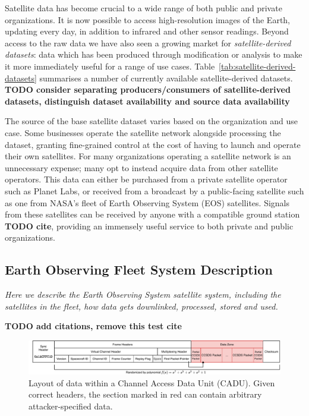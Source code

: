 Satellite data has become crucial to a wide range of both public and private organizations.
It is now possible to access high-resolution images of the Earth, updating every day, in addition to infrared and other sensor readings.
Beyond access to the raw data we have also seen a growing market for \textit{satellite-derived datasets}: data which has been produced through modification or analysis to make it more immediately useful for a range of use cases.
Table~\ref{tab:satellite-derived-datasets} summarises a number of currently available satellite-derived datasets.
\textbf{TODO consider separating producers/consumers of satellite-derived datasets, distinguish dataset availability and source data availability}

The source of the base satellite dataset varies based on the organization and use case.
Some businesses operate the satellite network alongside processing the dataset, granting fine-grained control at the cost of having to launch and operate their own satellites.
For many organizations operating a satellite network is an unnecessary expense; many opt to instead acquire data from other satellite operators.
This data can either be purchased from a private satellite operator such as Planet Labs, or received from a broadcast by a public-facing satellite such as one from NASA's fleet of Earth Observing System (EOS) satellites.
Signals from these satellites can be received by anyone with a compatible ground station \textbf{TODO cite}, providing an immensely useful service to both private and public organizations.


\subsection{Earth Observing Fleet System Description}

\textit{Here we describe the Earth Observing System satellite system, including the satellites in the fleet, how data gets downlinked, processed, stored and used.}



\textbf{TODO add citations, remove this test cite}~\cite{moser2019digital}

\begin{figure}
    \centering
    \includegraphics[width=\textwidth]{diagrams/cadu_diagram.pdf}
    \caption{Layout of data within a Channel Access Data Unit (CADU). Given correct headers, the section marked in red can contain arbitrary attacker-specified data.}
    \label{fig:cadu_diagram}
\end{figure}

